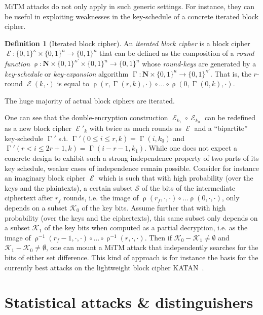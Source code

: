 \documentclass[11pt,a4paper]{article}
\theoremstyle{definition}
\newtheorem{defi}{Definition}
\theoremstyle{theorem}
\DeclareMathOperator\E{\mathcal{E}}
\DeclareMathOperator\rf{\rho}
\DeclareMathOperator\ksched{\Gamma}
\newcommand\msb{\{0,1\}^n}
\newcommand\ksb{\{0,1\}^\kappa}
\newcommand\ksr{\{0,1\}^{\kappa'}}
\begin{document}
MiTM attacks do not only apply in such generic settings. For instance, they can be useful in exploiting weaknesses in the
key-schedule of a concrete iterated block cipher.
\begin{defi}[Iterated block cipher]
An \emph{iterated block cipher} is a block cipher $\E : \ksb \times \msb \rightarrow \msb$ that can be defined as
the composition of a \emph{round function} $\rf : \mathbf{N} \times \ksr \times \msb \rightarrow \msb$ whose \emph{round-keys}
are generated by a \emph{key-schedule} or \emph{key-expansion} algorithm $\ksched : \mathbf{N} \times \ksb \rightarrow \ksr$.
That is, the $r$-round $\E(k,\cdot)$ is equal to $\rf(r,\ksched(r,k),\cdot) \circ \ldots \circ \rf(0,\ksched(0,k),\cdot)$.
\end{defi}
The huge majority of actual block ciphers are iterated. 

One can see that the double-encryption construction $\E_{k_1} \circ \E_{k_0}$ can be redefined as a new block cipher
$\E'_k$ with twice as much rounds as $\E$ and a ``bipartite'' key-schedule $\ksched'$ s.t. $\ksched'(0 \leq i \leq r, k) = \ksched(i,k_0)$
and $\ksched'(r < i \leq 2r+1,k) = \ksched(i-r-1,k_1)$. While one does not expect a concrete design to exhibit such a strong independence
property of two parts of its key schedule, weaker cases of independence remain possible.
Consider for instance an imaginary block cipher $\E$ which is such that
with high probability (over the keys and the plaintexts), a certain subset $\mathcal{S}$ of the bits of the intermediate ciphertext after
$r_f$ rounds, i.e. the image of $\rf(r_f,\cdot,\cdot) \circ \ldots \rf(0,\cdot,\cdot)$, only depends on a subset $\mathcal{K}_0$
of the key bits. Assume further that with high probability (over the keys and the ciphertexts), this same subset only depends on
a subset $\mathcal{K}_1$ of the key bits when computed as a partial decryption, i.e. as the image of
$\rf^{-1}(r_f - 1,\cdot,\cdot) \circ \ldots \circ \rf^{-1}(r,\cdot,\cdot)$. Then if $\mathcal{K}_0 - \mathcal{K}_1 \neq \emptyset$ and
$\mathcal{K}_1 - \mathcal{K}_0 \neq \emptyset$,
one can mount a MiTM attack that independently searches for the bits of either set difference.
This kind of approach is for instance the basis for the currently best attacks on the lightweight block cipher KATAN~\cite{DBLP:conf/ches/CanniereDK09,DBLP:conf/fse/FuhrM14}.


\section{Statistical attacks \& distinguishers}
\end{document}
